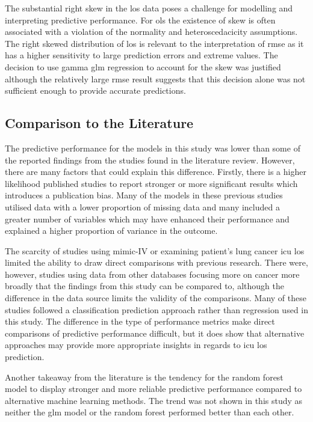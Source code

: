 \documentclass[11pt]{article}
\begin{document}
The substantial right skew in the \gls{los} data poses a challenge for modelling and interpreting predictive performance. For \gls{ols} the existence of skew is often associated with a violation of the normality and heteroscedacicity assumptions.\cite{Osborne2002} The right skewed distribution of \gls{los} is relevant to the interpretation of  \gls{rmse} as it has a higher sensitivity to large prediction errors and extreme values. The decision to use gamma \gls{glm} regression to account for the skew was justified although the relatively large \gls{rmse} result suggests that this decision alone was not sufficient enough to provide accurate predictions.

\subsection{Comparison to the Literature}

The predictive performance for the models in this study was lower than some of the reported findings from the studies found in the literature review. However, there are many factors that could explain this difference. Firstly, there is a higher likelihood published studies to report stronger or more significant results which introduces a publication bias.\cite{Dwan2008} Many of the models in these previous studies utilised data with a lower proportion of missing data and many included a greater number of variables which may have enhanced their performance and explained a higher proportion of variance in the outcome. 

The scarcity of studies using \gls{mimic}-IV or examining patient's lung cancer \gls{icu} \gls{los} limited the ability to draw direct comparisons with previous research. There were, however, studies using data from other databases focusing more on cancer more broadly that the findings from this study can be compared to, although the difference in the data source limits the validity of the comparisons. Many of these studies followed a classification prediction approach rather than regression used in this study. The difference in the type of performance metrics make direct comparisons of predictive performance difficult, but it does show that alternative approaches may provide more appropriate insights in regards to \gls{icu} \gls{los} prediction.

Another takeaway from the literature is the tendency for the random forest model to display stronger and more reliable predictive performance compared to alternative machine learning methods. The trend was not shown in this study as neither the \gls{glm} model or the random forest performed better than each other. 
\end{document}
